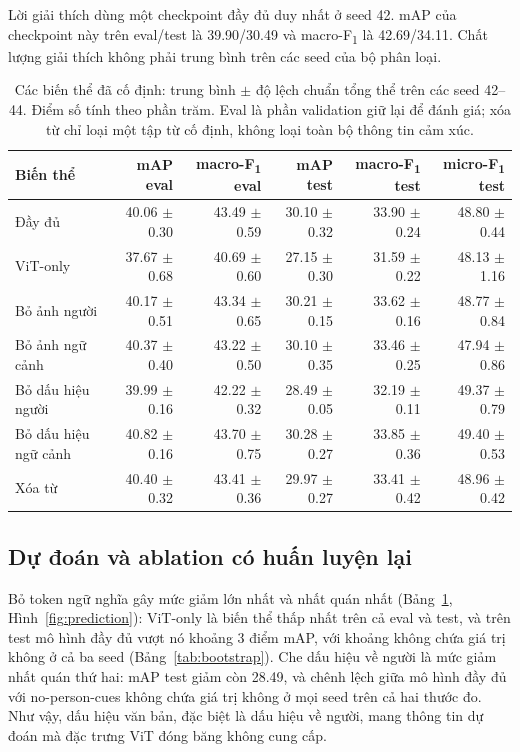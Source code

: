 \documentclass[conference]{IEEEtran}
\newcommand{\mf}{macro-F\textsubscript{1}}
\newcommand{\mi}{micro-F\textsubscript{1}}
\newcommand{\tablegap}{\setlength{\tabcolsep}{4pt}}
\begin{document}
Lời giải thích dùng một checkpoint đầy đủ duy nhất ở seed 42. mAP của checkpoint này trên eval/test là 39.90/30.49 và \mf{} là 42.69/34.11. Chất lượng giải thích không phải trung bình trên các seed của bộ phân loại.

\begin{table}[t]
\centering
\caption{Các biến thể đã cố định: trung bình $\pm$ độ lệch chuẩn tổng thể trên các seed 42--44. Điểm số tính theo phần trăm. Eval là phần validation giữ lại để đánh giá; xóa từ chỉ loại một tập từ cố định, không loại toàn bộ thông tin cảm xúc.}
\label{tab:variants}
\small
\tablegap
\begin{tabular}{lrrrrr}
\toprule
Biến thể & mAP eval & \mf{} eval & mAP test & \mf{} test & \mi{} test \\
\midrule
Đầy đủ & 40.06 $\pm$ 0.30 & 43.49 $\pm$ 0.59 & 30.10 $\pm$ 0.32 & 33.90 $\pm$ 0.24 & 48.80 $\pm$ 0.44 \\
ViT-only & 37.67 $\pm$ 0.68 & 40.69 $\pm$ 0.60 & 27.15 $\pm$ 0.30 & 31.59 $\pm$ 0.22 & 48.13 $\pm$ 1.16 \\
Bỏ ảnh người & 40.17 $\pm$ 0.51 & 43.34 $\pm$ 0.65 & 30.21 $\pm$ 0.15 & 33.62 $\pm$ 0.16 & 48.77 $\pm$ 0.84 \\
Bỏ ảnh ngữ cảnh & 40.37 $\pm$ 0.40 & 43.22 $\pm$ 0.50 & 30.10 $\pm$ 0.35 & 33.46 $\pm$ 0.25 & 47.94 $\pm$ 0.86 \\
Bỏ dấu hiệu người & 39.99 $\pm$ 0.16 & 42.22 $\pm$ 0.32 & 28.49 $\pm$ 0.05 & 32.19 $\pm$ 0.11 & 49.37 $\pm$ 0.79 \\
Bỏ dấu hiệu ngữ cảnh & 40.82 $\pm$ 0.16 & 43.70 $\pm$ 0.75 & 30.28 $\pm$ 0.27 & 33.85 $\pm$ 0.36 & 49.40 $\pm$ 0.53 \\
Xóa từ & 40.40 $\pm$ 0.32 & 43.41 $\pm$ 0.36 & 29.97 $\pm$ 0.27 & 33.41 $\pm$ 0.42 & 48.96 $\pm$ 0.42 \\
\bottomrule
\end{tabular}
\end{table}

\subsection{Dự đoán và ablation có huấn luyện lại}\label{sec:prediction}
Bỏ token ngữ nghĩa gây mức giảm lớn nhất và nhất quán nhất (Bảng~\ref{tab:variants}, Hình~\ref{fig:prediction}): ViT-only là biến thể thấp nhất trên cả eval và test, và trên test mô hình đầy đủ vượt nó khoảng 3 điểm mAP, với khoảng không chứa giá trị không ở cả ba seed (Bảng~\ref{tab:bootstrap}). Che dấu hiệu về người là mức giảm nhất quán thứ hai: mAP test giảm còn 28.49, và chênh lệch giữa mô hình đầy đủ với no-person-cues không chứa giá trị không ở mọi seed trên cả hai thước đo. Như vậy, dấu hiệu văn bản, đặc biệt là dấu hiệu về người, mang thông tin dự đoán mà đặc trưng ViT đóng băng không cung cấp.
\end{document}
